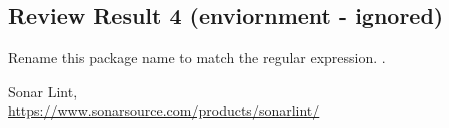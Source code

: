 \documentclass{article}
\begin{document}
\subsection{Review Result 4 (enviornment - ignored)} 
Rename this package name to match the regular expression.
.\\
\begin{thebibliography}{9}
Sonar Lint,\\
\url{https://www.sonarsource.com/products/sonarlint/}
\end{thebibliography}
\end{document}
